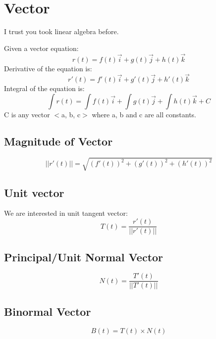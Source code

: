 \section{Vector}
I trust you took linear algebra before.

\begin{theorem}{}{}
Given a vector equation:
    \begin{equation}
        r(t)=f(t)\Vec{i}+g(t)\Vec{j}+h(t)\Vec{k}
    \end{equation}
Derivative of the equation is:
    \begin{equation}
        r'(t)=f'(t)\Vec{i}+g'(t)\Vec{j}+h'(t)\Vec{k}
    \end{equation}
Integral of the equation is:
    \begin{equation}
        \int r(t)=\int f(t)\Vec{i}+\int g(t)\Vec{j}+\int h(t)\Vec{k}+C
    \end{equation}
    C is any vector $<$a, b, c$>$ where a, b and c are all constants.
\end{theorem}

\subsection{Magnitude of Vector}
\begin{equation}
    ||r'(t)||=\sqrt{(f'(t))^2+(g'(t))^2+(h'(t))^2}
\end{equation}

\subsection{Unit vector}
We are interested in unit tangent vector:
\begin{equation}
    T(t)=\frac{r'(t)}{||r'(t)||}
\end{equation}

\subsection{Principal/Unit Normal Vector}
\begin{equation}
    N(t)=\frac{T'(t)}{||T'(t)||}
\end{equation}

\subsection{Binormal Vector}
\begin{equation}
    B(t)=T(t)\times N(t)
\end{equation}

